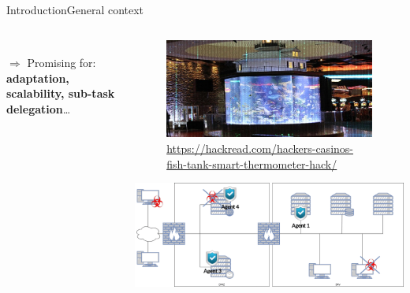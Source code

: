 \begin{frame}{Introduction}{General context}
\begin{columns}
\begin{column}{0.7\textwidth}
            \ \\

            $\Longrightarrow$ Promising for: \textbf{adaptation, scalability, sub-task delegation}\dots

        \end{column}

        \begin{column}{0.4\textwidth}
            \begin{figure}
                \includegraphics[width=\linewidth]{figures/casino.jpg}
                \caption*{\tiny\url{https://hackread.com/hackers-casinos-fish-tank-smart-thermometer-hack/}}
            \end{figure}

            \vspace{0.cm}

            \includegraphics[width=\linewidth]{figures/company_network.png}
        \end{column}

    \end{columns}

\end{frame}

